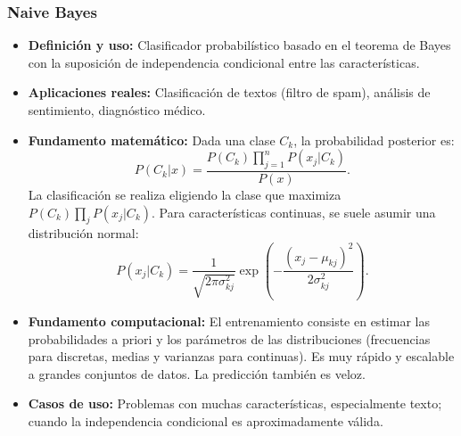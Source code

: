 \documentclass[12pt,a4paper,openany,oneside]{book}
\begin{document}
\subsubsection{Naive Bayes}
\begin{itemize}
    \item \textbf{Definición y uso:} Clasificador probabilístico basado en el teorema de Bayes con la suposición de independencia condicional entre las características.
    \item \textbf{Aplicaciones reales:} Clasificación de textos (filtro de spam), análisis de sentimiento, diagnóstico médico.
    \item \textbf{Fundamento matemático:} Dada una clase \(C_k\), la probabilidad posterior es:
    \[
    P(C_k|x) = \frac{P(C_k) \prod_{j=1}^n P(x_j|C_k)}{P(x)}.
    \]
    La clasificación se realiza eligiendo la clase que maximiza \(P(C_k) \prod_j P(x_j|C_k)\). Para características continuas, se suele asumir una distribución normal:
    \[
    P(x_j|C_k) = \frac{1}{\sqrt{2\pi\sigma_{kj}^2}} \exp\left( -\frac{(x_j - \mu_{kj})^2}{2\sigma_{kj}^2} \right).
    \]
    \item \textbf{Fundamento computacional:} El entrenamiento consiste en estimar las probabilidades a priori y los parámetros de las distribuciones (frecuencias para discretas, medias y varianzas para continuas). Es muy rápido y escalable a grandes conjuntos de datos. La predicción también es veloz.
    \item \textbf{Casos de uso:} Problemas con muchas características, especialmente texto; cuando la independencia condicional es aproximadamente válida.
\end{itemize}
\end{document}
